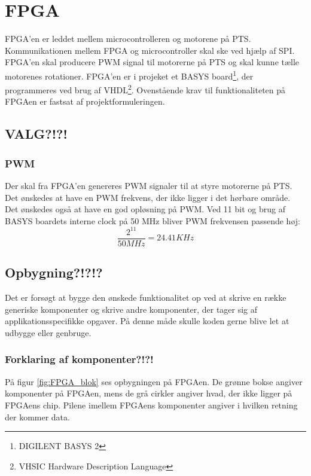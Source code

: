 \section{FPGA}
\label{sec:FPGA}
FPGA'en er leddet mellem microcontrolleren og motorene på PTS. 
Kommunikationen mellem FPGA og microcontroller skal ske ved hjælp af SPI. 
FPGA'en skal producere PWM signal til motorerne på PTS og skal kunne tælle motorenes rotationer. 
FPGA'en er i projeket et BASYS board\footnote{DIGILENT BASYS 2}, der programmeres ved brug af VHDL\footnote{VHSIC Hardware Description Language}.
Ovenstående krav til funktionaliteten på FPGAen er fastsat af 
projektformuleringen.


\subsection{VALG?!?!}
\subsubsection*{PWM}
Der skal fra FPGA'en genereres PWM signaler til at styre motorerne på PTS.
Det ønskedes at have en PWM frekvens, der ikke ligger i det hørbare område. 
Det ønskedes også at have en god opløsning på PWM. 
Ved 11 bit og brug af BASYS boardets interne clock på 50 MHz bliver PWM frekvensen passende høj:
\begin{equation}
  \frac{2^{11}}{50 MHz} = 24.41 KHz 
\end{equation}

\subsection{Opbygning?!?!?}
Det er forsøgt at bygge den ønskede funktionalitet op ved at skrive en række generiske komponenter og skrive andre komponenter, der tager sig af applikationsspecifikke opgaver. 
På denne måde skulle koden gerne blive let at udbygge eller genbruge. 
\subsubsection*{Forklaring af komponenter?!?!}
På figur \ref{fig:FPGA_blok} ses opbygningen på FPGAen. De grønne bokse angiver 
komponenter på FPGAen, mens de grå cirkler angiver hvad, der ikke ligger på 
FPGAens chip. Pilene imellem FPGAens komponenter angiver i hvilken retning der 
kommer data.


